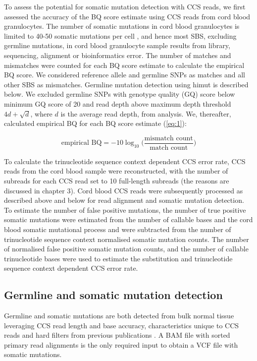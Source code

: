 To assess the potential for somatic mutation detection with CCS reads, we first assessed the accuracy of the BQ score estimate using CCS reads from cord blood granulocytes. The number of somatic mutations in cord blood granulocytes is limited to 40-50 somatic mutations per cell \cite{Osorio2018-mh}, and hence most SBS, excluding germline mutations, in cord blood granulocyte sample results from library, sequencing, alignment or bioinformatics error. The number of matches and mismatches were counted for each BQ score estimate to calculate the empirical BQ score. We considered reference allele and germline SNPs as matches and all other SBS as mismatches. Germline mutation detection using himut is described below. We excluded germline SNPs with genotype quality (GQ) score below minimum GQ score of 20 and read depth above maximum depth threshold $4d + \sqrt{d}$, where $d$ is the average read depth, from analysis. We, thereafter, calculated empirical BQ for each BQ score estimate (\ref{eq:1}): 

\begin{equation} \label{eq:1}
\text{empirical BQ} = -10\log_{10} \Big( \frac{\text{mismatch count}}{\text{match count}} \Big)
\end{equation}

To calculate the trinucleotide sequence context dependent CCS error rate, CCS reads from the cord blood sample were reconstructed, with the number of subreads for each CCS read set to 10 full-length subreads (the reasons are discussed in chapter 3). Cord blood CCS reads were subsequently processed as described above and below for read alignment and somatic mutation detection. To estimate the number of false positive mutations, the number of true positive somatic mutations were estimated from the number of callable bases and the cord blood somatic mutational process \cite{Mitchell2022-ry} and were subtracted from the number of trinucleotide sequence context normalised somatic mutation counts. The number of normalised false positive somatic mutation counts, and the number of callable trinucleotide bases were used to estimate the substitution and trinucleotide sequence context dependent CCS error rate. 

\subsection{Germline and somatic mutation detection}

Germline and somatic mutations are both detected from bulk normal tissue leveraging CCS read length and base accuracy, characteristics unique to CCS reads and hard filters from previous publications \cite{DePristo2011-vf, Kim2018-qi}. A BAM file with sorted primary read alignments is the only required input to obtain a VCF file with somatic mutations. 

